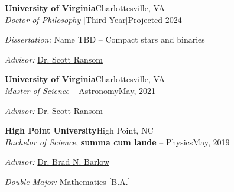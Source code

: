 \documentclass[letterpaper,12pt]{article}
\begin{document}
\vspace{2mm}
\begin{minipage}{6.1in}
\textbf{University of Virginia}\hfill Charlottesville, VA\\ %
\textit{Doctor of Philosophy} [Third Year]\hfill Projected 2024

\hspace{0.5in} \textit{Dissertation:} Name TBD -- Compact stars and binaries

\hspace{0.5in} \textit{Advisor:} \href{https://www.cv.nrao.edu/~sransom/}{\textcolor{rotundaorange}{Dr. Scott Ransom}}

\vspace{2mm}
\textbf{University of Virginia}\hfill Charlottesville, VA\\ %
\textit{Master of Science} -- Astronomy\hfill May, 2021

\hspace{0.5in} \textit{Advisor:} \href{https://www.cv.nrao.edu/~sransom/}{\textcolor{rotundaorange}{Dr. Scott Ransom}}

\vspace{2mm}
\textbf{High Point University}\hfill High Point, NC\\
\textit{Bachelor of Science}, \textbf{summa cum laude} -- Physics\hfill May, 2019

\hspace{0.5in} \textit{Advisor:} \href{http://physics.highpoint.edu/~bbarlow/}{\textcolor{rotundaorange}{Dr. Brad N. Barlow}}

\hspace{0.5in} \textit{Double Major:} Mathematics [B.A.]

\end{minipage}
\end{document}

